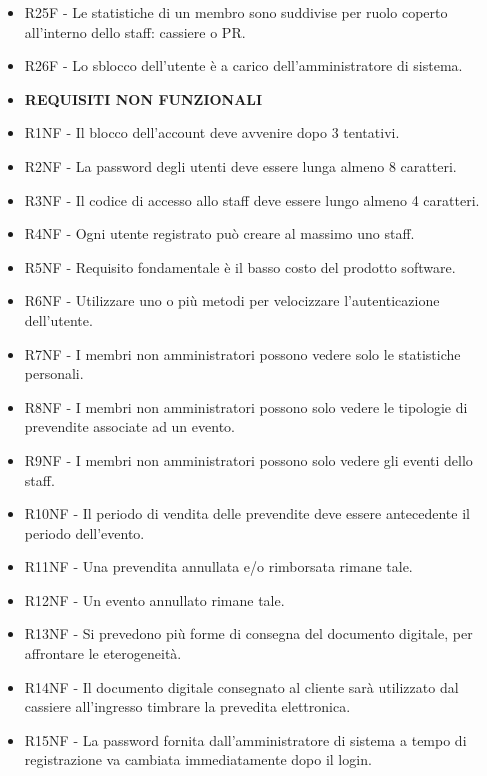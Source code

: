 \documentclass[a4paper]{article}
\begin{document}
\begin{itemize}
	\item R25F - Le statistiche di un membro sono suddivise per ruolo coperto all'interno dello staff: cassiere o PR.
	
	\item R26F - Lo sblocco dell'utente è a carico dell'amministratore di sistema.
	
		
    \item \textbf{REQUISITI NON FUNZIONALI}
	
	\item R1NF - Il blocco dell'account deve avvenire dopo 3 tentativi.
	
	\item R2NF - La password degli utenti deve essere lunga almeno 8 caratteri.
	\item R3NF - Il codice di accesso allo staff deve essere lungo almeno 4 caratteri.
	\item R4NF - Ogni utente registrato può creare al massimo uno staff.
	\item R5NF - Requisito fondamentale è il basso costo del prodotto software.
	\item R6NF - Utilizzare uno o più metodi per velocizzare l'autenticazione dell'utente.
	\item R7NF - I membri non amministratori possono vedere solo le statistiche personali.	
	\item R8NF - I membri non amministratori possono solo vedere le tipologie di prevendite associate ad un evento.
	\item R9NF - I membri non amministratori possono solo vedere gli eventi dello staff.
	\item R10NF - Il periodo di vendita delle prevendite deve essere antecedente il periodo dell'evento.
	\item R11NF - Una prevendita annullata e/o rimborsata rimane tale.
	\item R12NF - Un evento annullato rimane tale.
	\item R13NF - Si prevedono più forme di consegna del documento digitale, per affrontare le eterogeneità.
	\item R14NF - Il documento digitale consegnato al cliente sarà utilizzato dal cassiere all'ingresso timbrare la prevedita elettronica.
	\item R15NF - La password fornita dall'amministratore di sistema a tempo di registrazione va cambiata immediatamente dopo il login.
	

\end{itemize}
\end{document}
